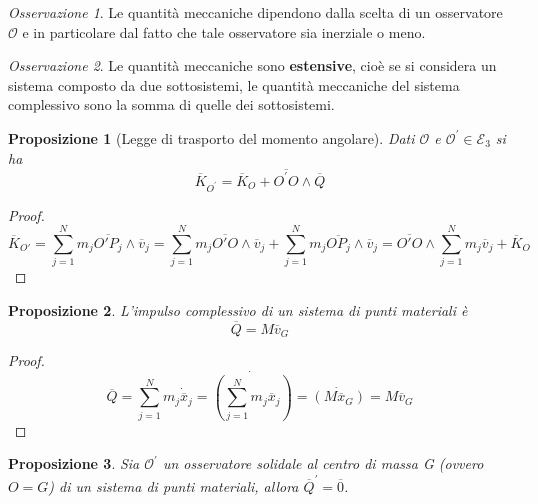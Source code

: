 \documentclass{book}
\theoremstyle{plain}
\theoremstyle{plain}
\theoremstyle{plain}
\theoremstyle{plain}
\theoremstyle{plain}
\newtheorem{prop}{Proposizione}[chapter]
\theoremstyle{definition}
\theoremstyle{remark}
\newtheorem*{oss}{Osservazione}
\theoremstyle{definition}
\begin{document}
\begin{oss}
    Le quantità meccaniche dipendono dalla scelta di un osservatore $\mathcal{O}$ e in particolare dal fatto che tale osservatore sia inerziale o meno.
\end{oss}

\begin{oss}
     Le quantità meccaniche sono \textbf{estensive}, cioè se si considera un sistema composto da due sottosistemi, le quantità meccaniche del sistema complessivo sono la somma di quelle dei sottosistemi.
\end{oss}

\begin{prop}[Legge di trasporto del momento angolare]
    Dati $\mathcal{O}$ e $\mathcal{O}^{\prime} \in \mathcal{E}_3$ si ha
    \begin{displaymath}
    \boxed{
        \overline{K}_{O^{\prime}}= \overline{K}_O + \overline{O^{\prime}O} \wedge \overline{Q}
        }
    \end{displaymath}
\end{prop}

\begin{proof}
    \begin{displaymath}
        \overline{K}_{O'}=\sum_{j=1}^Nm_j\overline{O'P_j}\wedge\overline{v}_j=\sum_{j=1}^Nm_j\overline{O'O}\wedge\overline{v}_j+\sum_{j=1}^Nm_j\overline{OP_j}\wedge\overline{v}_j=\overline{O'O}\wedge\sum_{j=1}^Nm_j\overline{v}_j+\overline{K}_O
    \end{displaymath}
\end{proof}

\begin{prop}
    L'impulso complessivo di un sistema di punti materiali è
    \begin{displaymath}
    \boxed{
        \overline{Q}= M \overline{v}_G
        }
    \end{displaymath}
\end{prop}

\begin{proof}
    \begin{displaymath}
        \overline{Q}=\sum_{j=1}^Nm_j\Dot{\overline{x}}_j=\Dot{\left(\sum_{j=1}^Nm_j\overline{x}_j\right)}=\Dot{\left(M\overline{x}_G\right)}=M\overline{v}_G
    \end{displaymath}
\end{proof}

\begin{prop}
    Sia $\mathcal{O}^{\prime}$ un osservatore solidale al centro di massa G (ovvero $O=G$) di un sistema di punti materiali, allora $\overline{Q}^{\prime}=\overline{0}$.
\end{prop}
\end{document}
